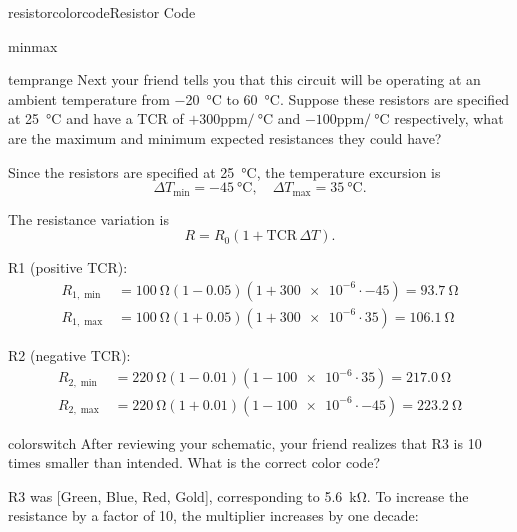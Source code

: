 \begin{mainquestion}{resistorcolorcode}{Resistor Code}
\begin{partquestion}{minmax}
\begin{answer}
\end{answer}
\end{partquestion}

\begin{partquestion}{temprange}
{Next your friend tells you that this circuit will be operating at an ambient temperature from \qty{-20}{\celsius} to \qty{60}{\celsius}. Suppose these resistors are specified at \qty{25}{\celsius} and have a TCR of $+300\text{ppm}/\qty{}{\celsius}$ and $-100\text{ppm}/\qty{}{\celsius}$ respectively, what are the maximum and minimum expected resistances they could have?}

\begin{answer}

Since the resistors are specified at \qty{25}{\celsius}, the temperature excursion is
\[
\Delta T_{\min} = \qty{-45}{\celsius}, \quad
\Delta T_{\max} = \qty{35}{\celsius}.
\]

The resistance variation is
\[
R = R_0\left(1 + \mathrm{TCR}\,\Delta T\right).
\]

R1 (positive TCR):
\begin{align*}
R_{1,\min} &= \qty{100}{\ohm}\left(1-\num{0.05}\right)\left(1+\num{300e-6}\cdot\num{-45}\right)
= \qty{93.7}{\ohm} \\
R_{1,\max} &= \qty{100}{\ohm}\left(1+\num{0.05}\right)\left(1+\num{300e-6}\cdot\num{35}\right)
= \qty{106.1}{\ohm}
\end{align*}

R2 (negative TCR):
\begin{align*}
R_{2,\min} &= \qty{220}{\ohm}\left(1-\num{0.01}\right)\left(1-\num{100e-6}\cdot\num{35}\right)
= \qty{217.0}{\ohm} \\
R_{2,\max} &= \qty{220}{\ohm}\left(1+\num{0.01}\right)\left(1-\num{100e-6}\cdot\num{-45}\right)
= \qty{223.2}{\ohm}
\end{align*}

\end{answer}
\end{partquestion}

\begin{partquestion}{colorswitch}
{After reviewing your schematic, your friend realizes that R3 is 10 times smaller than intended. What is the correct color code?}

\begin{answer}
R3 was [Green, Blue, Red, Gold], corresponding to \qty{5.6}{\kilo\ohm}.  
To increase the resistance by a factor of 10, the multiplier increases by one decade:


\end{answer}
\end{partquestion}
\end{mainquestion}
